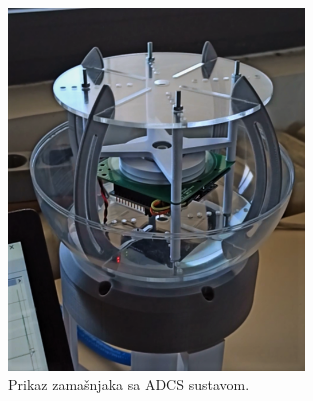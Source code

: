 \documentclass[times, utf8, diplomski, numeric]{templates/template}
\begin{document}
{{{            \begin{figure}[htb]
            \centering
            \includegraphics[width=0.7\textwidth]{images/zamasnjak.png}
            \caption{Prikaz zamašnjaka sa ADCS sustavom.}
            \label{fig:zamasnjak}
            \end{figure}
        }
    }
}
\end{document}
